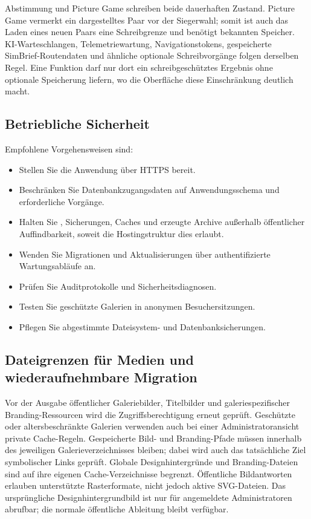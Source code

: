 \documentclass[11pt,a4paper]{article}
\newcommand{\filepath}[1]{\path{#1}}
\begin{document}
Abstimmung und Picture Game schreiben beide dauerhaften Zustand. Picture Game
vermerkt ein dargestelltes Paar vor der Siegerwahl; somit ist auch das Laden
eines neuen Paars eine Schreibgrenze und benötigt bekannten Speicher.
KI-Warteschlangen, Telemetriewartung, Navigationstokens, gespeicherte
SimBrief-Routendaten und ähnliche optionale Schreibvorgänge folgen derselben
Regel. Eine Funktion darf nur dort ein schreibgeschütztes Ergebnis ohne
optionale Speicherung liefern, wo die Oberfläche diese Einschränkung deutlich
macht.

\subsection{Betriebliche Sicherheit}

Empfohlene Vorgehensweisen sind:

\begin{itemize}
  \item Stellen Sie die Anwendung über HTTPS bereit.
  \item Beschränken Sie Datenbankzugangsdaten auf Anwendungsschema und
  erforderliche Vorgänge.
  \item Halten Sie \filepath{config.php}, Sicherungen, Caches und erzeugte
  Archive außerhalb öffentlicher Auffindbarkeit, soweit die Hostingstruktur dies
  erlaubt.
  \item Wenden Sie Migrationen und Aktualisierungen über authentifizierte
  Wartungsabläufe an.
  \item Prüfen Sie Auditprotokolle und Sicherheitsdiagnosen.
  \item Testen Sie geschützte Galerien in anonymen Besuchersitzungen.
  \item Pflegen Sie abgestimmte Dateisystem- und Datenbanksicherungen.
\end{itemize}
\subsection{Dateigrenzen für Medien und wiederaufnehmbare Migration}

Vor der Ausgabe öffentlicher Galeriebilder, Titelbilder und galeriespezifischer
Branding-Ressourcen wird die Zugriffsberechtigung erneut geprüft. Geschützte
oder altersbeschränkte Galerien verwenden auch bei einer Administratoransicht
private Cache-Regeln. Gespeicherte Bild- und Branding-Pfade müssen innerhalb des
jeweiligen Galerieverzeichnisses bleiben; dabei wird auch das tatsächliche Ziel
symbolischer Links geprüft. Globale Designhintergründe und Branding-Dateien sind
auf ihre eigenen Cache-Verzeichnisse begrenzt. Öffentliche Bildantworten
erlauben unterstützte Rasterformate, nicht jedoch aktive SVG-Dateien. Das
ursprüngliche Designhintergrundbild ist nur für angemeldete Administratoren
abrufbar; die normale öffentliche Ableitung bleibt verfügbar.
\end{document}

